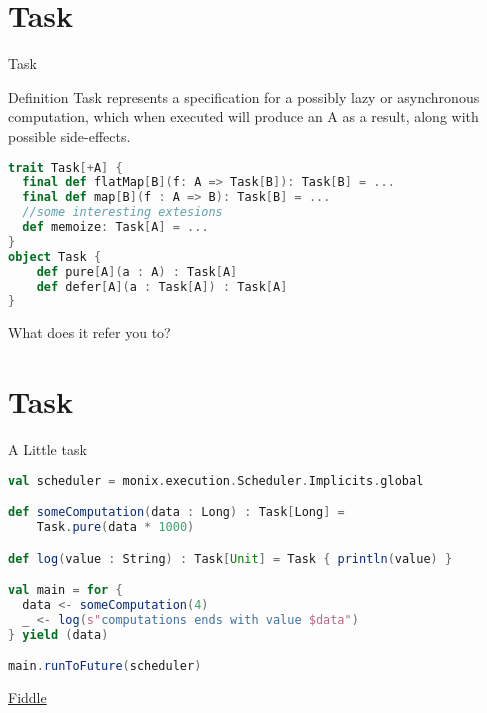 \documentclass[presentation]{beamer}
\begin{document}
\section{Task}
\begin{frame}[fragile]{Task}

\begin{block}{Definition}
  Task represents a specification for a possibly lazy or asynchronous computation, which when executed will produce an A as a result, along with possible side-effects.
\end{block}
\begin{lstlisting}[language=Scala]
trait Task[+A] {
  final def flatMap[B](f: A => Task[B]): Task[B] = ...
  final def map[B](f : A => B): Task[B] = ...
  //some interesting extesions
  def memoize: Task[A] = ...
}
object Task {
    def pure[A](a : A) : Task[A]
    def defer[A](a : Task[A]) : Task[A]
}
\end{lstlisting}
\begin{center}
  What does it refer you to?
\end{center}

\end{frame}

\section{Task}
\begin{frame}[fragile]{A Little task}

\begin{lstlisting}[language=Scala]
val scheduler = monix.execution.Scheduler.Implicits.global

def someComputation(data : Long) : Task[Long] = 
    Task.pure(data * 1000)

def log(value : String) : Task[Unit] = Task { println(value) }

val main = for {
  data <- someComputation(4)
  _ <- log(s"computations ends with value $data")
} yield (data)

main.runToFuture(scheduler)
\end{lstlisting}
\begin{center}
  \href{https://scalafiddle.io/sf/C4Qon6a/1}{Fiddle}
\end{center}

\end{frame}
\end{document}
